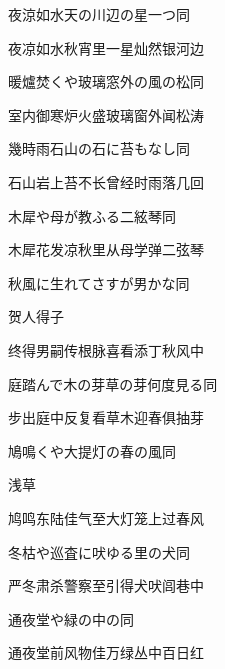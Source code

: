 \begin{haiku}
    {\FH 夜涼如水天の川辺の星一つ}\hfill{\FH 同}

    {\FK 夜凉如水秋宵里一星灿然银河边}
\end{haiku}

\begin{haiku}
    {\FH 暖爐焚くや玻璃窓外の風の松}\hfill{\FH 同}

    {\FK 室内御寒炉火盛玻璃窗外闻松涛}
\end{haiku}

\begin{haiku}
    {\FH 幾時雨石山の石に苔もなし}\hfill{\FH 同}

    {\FK 石山岩上苔不长曾经时雨落几回}
\end{haiku}

\begin{haiku}
    {\FH 木犀や母が教ふる二絃琴}\hfill{\FH 同}

    {\FK 木犀花发凉秋里从母学弹二弦琴}
\end{haiku}

\begin{haiku}
    {\FH 秋風に生れてさすが男かな}\hfill{\FH 同}

    {\FK 贺人得子}

    {\FK 终得男嗣传根脉喜看添丁秋风中}
\end{haiku}

\begin{haiku}
    {\FH 庭踏んで木の芽草の芽何度見る}\hfill{\FH 同}

    {\FK 步出庭中反复看草木迎春俱抽芽}
\end{haiku}

\begin{haiku}
    {\FH 鳩鳴くや大提灯の春の風}\hfill{\FH 同}

    {\FK 浅草}

    {\FK 鸠鸣东陆佳气至大灯笼上过春风}
\end{haiku}

\begin{haiku}
    {\FH 冬枯や巡査に吠ゆる里の犬}\hfill{\FH 同}

    {\FK 严冬肃杀警察至引得犬吠闾巷中}
\end{haiku}

\begin{haiku}
    {\FH 通夜堂や緑の中の}\hfill{\FH 同}

    {\FK 通夜堂前风物佳万绿丛中百日红}
\end{haiku}

